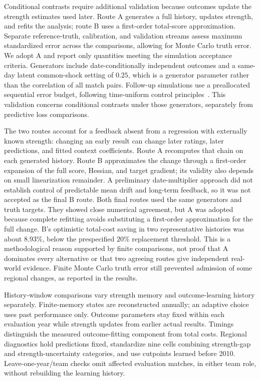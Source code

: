 Conditional contrasts require additional validation because outcomes update the strength estimates used later. Route A generates a full history, updates strength, and refits the analysis; route B uses a first-order total-score approximation. Separate reference-truth, calibration, and validation streams assess maximum standardized error across the comparisons, allowing for Monte Carlo truth error. We adopt A and report only quantities meeting the simulation acceptance criteria. Generators include date-conditionally independent outcomes and a same-day latent common-shock setting of $0.25$, which is a generator parameter rather than the correlation of all match pairs. Follow-up simulations use a preallocated sequential error budget, following time-uniform control principles~\cite{howard2021confidence}. This validation concerns conditional contrasts under those generators, separately from predictive loss comparisons.

The two routes account for a feedback absent from a regression with externally known strength: changing an early result can change later ratings, later predictions, and fitted context coefficients. Route A recomputes that chain on each generated history. Route B approximates the change through a first-order expansion of the full score, Hessian, and target gradient; its validity also depends on small linearization remainder. A preliminary date-multiplier approach did not establish control of predictable mean drift and long-term feedback, so it was not accepted as the final B route. Both final routes used the same generators and truth targets. They showed close numerical agreement, but A was adopted because complete refitting avoids substituting a first-order approximation for the full change. B's optimistic total-cost saving in two representative histories was about $8.93\%$, below the prespecified $20\%$ replacement threshold. This is a methodological reason supported by finite comparisons, not proof that A dominates every alternative or that two agreeing routes give independent real-world evidence. Finite Monte Carlo truth error still prevented admission of some regional changes, as reported in the results.

History-window comparisons vary strength memory and outcome-learning history separately. Finite-memory states are reconstructed annually; an adaptive choice uses past performance only. Outcome parameters stay fixed within each evaluation year while strength updates from earlier actual results. Timings distinguish the measured outcome-fitting component from total costs. Regional diagnostics hold predictions fixed, standardize nine cells combining strength-gap and strength-uncertainty categories, and use cutpoints learned before 2010. Leave-one-year/team checks omit affected evaluation matches, in either team role, without rebuilding the learning history.

